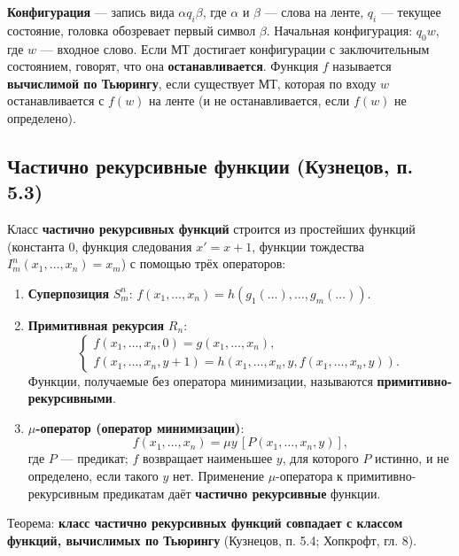\documentclass[a4paper,12pt]{article}
\begin{document}
\textbf{Конфигурация} --- запись вида \( \alpha q_i \beta \), где \( \alpha \) и \( \beta \) --- слова на ленте, \( q_i \) --- текущее состояние, головка обозревает первый символ \( \beta \). Начальная конфигурация: \( q_0 w \), где \( w \) --- входное слово. Если МТ достигает конфигурации с заключительным состоянием, говорят, что она \textbf{останавливается}. Функция \( f \) называется \textbf{вычислимой по Тьюрингу}, если существует МТ, которая по входу \( w \) останавливается с \( f(w) \) на ленте (и не останавливается, если \( f(w) \) не определено).

\subsection{Частично рекурсивные функции (Кузнецов, п. 5.3)}
Класс \textbf{частично рекурсивных функций} строится из простейших функций (константа 0, функция следования \( x' = x+1 \), функции тождества \( I_m^n(x_1,\dots,x_n)=x_m \)) с помощью трёх операторов:
\begin{enumerate}
    \item \textbf{Суперпозиция} \( S_m^n \): \( f(x_1,\dots,x_n)=h(g_1(\dots),\dots,g_m(\dots)) \).
    \item \textbf{Примитивная рекурсия} \( R_n \):
    \[
    \begin{cases}
        f(x_1,\dots,x_n,0)=g(x_1,\dots,x_n),\\
        f(x_1,\dots,x_n,y+1)=h(x_1,\dots,x_n,y,f(x_1,\dots,x_n,y)).
    \end{cases}
    \]
    Функции, получаемые без оператора минимизации, называются \textbf{примитивно-рекурсивными}.
    \item \textbf{\(\mu\)-оператор (оператор минимизации)}: 
    \[
    f(x_1,\dots,x_n)=\mu y\,[P(x_1,\dots,x_n,y)],
    \]
    где \( P \) --- предикат; \( f \) возвращает наименьшее \( y \), для которого \( P \) истинно, и не определено, если такого \( y \) нет. Применение \( \mu \)-оператора к примитивно-рекурсивным предикатам даёт \textbf{частично рекурсивные} функции.
\end{enumerate}
Теорема: \textbf{класс частично рекурсивных функций совпадает с классом функций, вычислимых по Тьюрингу} (Кузнецов, п. 5.4; Хопкрофт, гл. 8).
\end{document}
